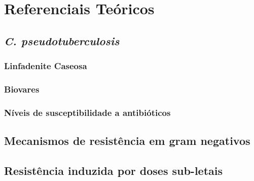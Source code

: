 \chapter{Referenciais Teóricos}
\label{cap:referenciais_teoricos}




\section{\textit{C. pseudotuberculosis }}
\subsection{Linfadenite Caseosa}
\subsection{Biovares}
\subsection{Níveis de susceptibilidade a antibióticos}
\section{Mecanismos de resistência em gram negativos}
\section{Resistência induzida por doses sub-letais}
